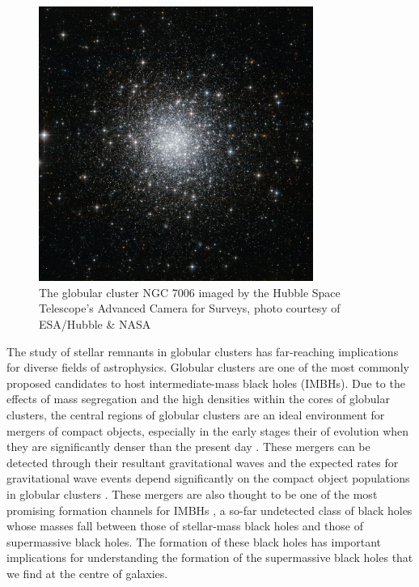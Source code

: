 \begin{figure}
	\centering
	\includegraphics[width=0.8\textwidth]{figures/c42.jpg}
	\caption{The globular cluster NGC 7006 imaged by the Hubble Space Telescope's Advanced
		Camera for Surveys, photo courtesy of ESA/Hubble \& NASA}
	\label{fig:1/ngc7006}
\end{figure}



The study of stellar remnants in globular clusters has far-reaching implications for diverse fields
of astrophysics. Globular clusters are one of the most commonly proposed candidates to host
intermediate-mass black holes (IMBHs). Due to the effects of mass segregation and the high densities
within the cores of globular clusters, the central regions of globular clusters are an ideal
environment for mergers of compact objects, especially in the early stages their of evolution when
they are significantly denser than the present day \citep[e.g.][]{Rodriguez2021}. These mergers can
be detected through their resultant gravitational waves and the expected rates for gravitational
wave events depend significantly on the compact object populations in globular clusters
\citep{Weatherford2021}. These mergers are also thought to be one of the most promising formation
channels for IMBHs \citep[e.g.][]{Giersz2015}, a so-far undetected class of black holes whose masses
fall between those of stellar-mass black holes and those of supermassive black holes. The formation
of these black holes has important implications for understanding the formation of the supermassive
black holes that we find at the centre of galaxies.


